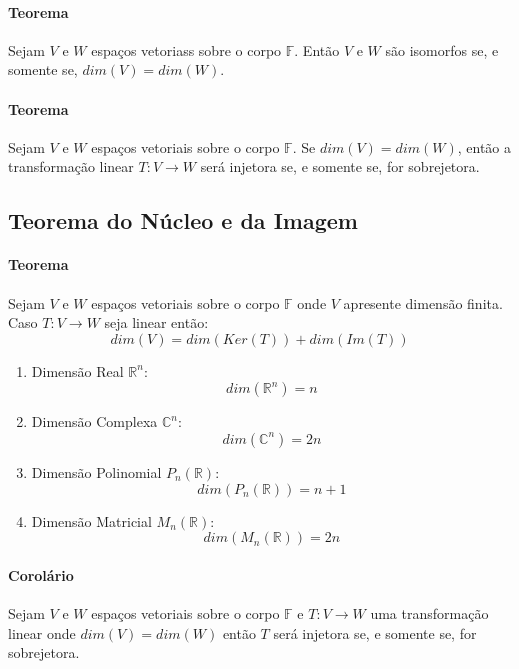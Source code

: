 \documentclass{article}
\begin{document}
            \paragraph{Teorema}Sejam $V$ e $W$ espaços vetoriass sobre o corpo $\mathbb{F}$. Então $V$ e $W$ são isomorfos se, e somente se, $dim(V) = dim(W)$.

            \paragraph{Teorema}Sejam $V$ e $W$ espaços vetoriais sobre o corpo $\mathbb{F}$. Se $dim(V) = dim(W)$, então a transformação linear $T: V \rightarrow W$ será injetora se, e somente se, for sobrejetora.

        \subsection{Teorema do Núcleo e da Imagem}
            \paragraph{Teorema}Sejam $V$ e $W$ espaços vetoriais sobre o corpo $\mathbb{F}$ onde $V$ apresente dimensão finita. Caso $T: V \rightarrow W$ seja linear então:
                \[\boxed{dim(V) = dim(Ker(T)) + dim(Im(T))}\]
                \begin{enumerate}[noitemsep]
                    \item Dimensão Real $\mathbb{R}^{n}$:
                        \[\boxed{dim(\mathbb{R}^{n}) = n}\]
                    \item Dimensão Complexa $\mathbb{C}^{n}$:
                        \[\boxed{dim(\mathbb{C}^{n}) = 2n}\]
                    \item Dimensão Polinomial $P_{n}(\mathbb{R})$:
                        \[\boxed{dim(P_{n}(\mathbb{R})) = n+1}\]
                    \item Dimensão Matricial $M_{n}(\mathbb{R})$:
                        \[\boxed{dim(M_{n}(\mathbb{R})) = 2n}\]
                \end{enumerate}

            \paragraph{Corolário}Sejam $V$ e $W$ espaços vetoriais sobre o corpo $\mathbb{F}$ e $T: V \rightarrow W$ uma transformação linear onde $dim(V) = dim(W)$ então $T$ será injetora se, e somente se, for sobrejetora.
\end{document}
